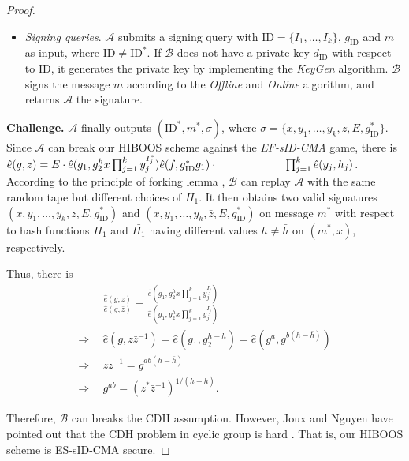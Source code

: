 \documentclass[times]{secauth}
\theoremstyle{definition}
\theoremstyle{remark}
\begin{document}
\begin{proof}
\begin{itemize}
	\item \emph{Signing queries}. 
	$\mathcal{A}$ submits a signing query with $\mathrm{ID} = \{I_1, \ldots, I_k\}$, $g_\mathrm{ID}$ and $m$ as input, where $\mathrm{ID} \neq \mathrm{ID}^*$.
	If $\mathcal{B}$ does not have a private key $d_{\mathrm{ID}}$ with respect to ID, it generates the private key by implementing the \emph{KeyGen} algorithm.	
	$\mathcal{B}$ signs the message $m$ according to the \emph{Offline} and \emph{Online} algorithm, and returns $\mathcal{A}$ the signature.
\end{itemize}
\textbf{Challenge.} 
$\mathcal{A}$ finally outputs $(\mathrm{ID}^*, m^*, \sigma)$, where $ \sigma=\{x, y_1, \ldots, y_k, z, E, g_{\mathrm{ID}}^*\}$. 
Since $\mathcal{A}$ can break our HIBOOS scheme against the \emph{EF-sID-CMA} game, there is $\hat{e}(g, z) = E \cdot \hat{e}(g_1, g_2^hx\prod_{j=1}^k y^{I^*_j}_j)\hat{e}(f, g_\mathrm{ID}^*g_1)\cdot \\ ~~~~~~~~~~~~~~~~~~\prod_{j=1}^k \hat{e}(y_j, h_j)$.
\\
According to the principle of forking lemma \cite{Pointcheval1996security}, $\mathcal{B}$ can replay $\mathcal{A}$ with the same random tape but different choices of $H_1$.
It then obtains two valid signatures $(x, y_1, \ldots, y_k, z, E, g_\mathrm{ID}^*)$ and $(x, y_1, \ldots, y_k, \bar{z}, E, g_\mathrm{ID}^*)$ on message $m^*$ with respect to hash functions $H_1$ and $\bar{H_1}$ having different values $h \neq \bar{h}$ on $(m^*, x)$, respectively. \par
Thus, there is 
\begin{align*}
&\frac{\hat{e}(g, z)}{\hat{e}(g, \bar{z})} = \frac{\hat{e}(g_1, g_2^hx\prod_{j=1}^k y_j^{I_j})}{\hat{e}(g_1, g_2^{\bar{h}}x\prod_{j=1}^k y_j^{I_j})}\\
\Rightarrow~~ &\hat{e}(g, z\bar{z}^{-1}) = \hat{e}(g_1, g_2^{h-\bar{h}})=\hat{e}(g^a, g^{b(h-\bar{h})})\\
\Rightarrow~~ &z\bar{z}^{-1} = g^{ab(h-\bar{h})}\\
\Rightarrow~~ &g^{ab} = (z^*\bar{z}^{-1})^{1/(h-\bar{h})}.
\end{align*}
\par
Therefore, $\mathcal{B}$ can breaks the CDH assumption.
However, Joux and Nguyen have pointed out that the CDH problem in cyclic group is hard \cite{joux2003separating}. 
That is, our HIBOOS scheme is ES-sID-CMA secure.
\end{proof}
\end{document}
